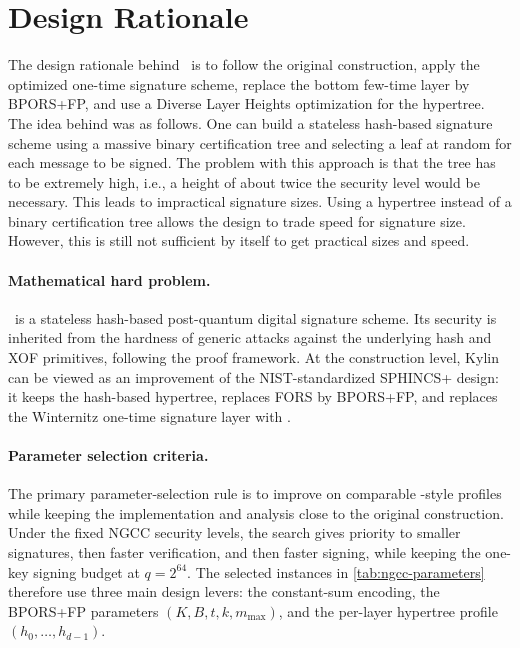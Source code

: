 \section{Design Rationale}
\label{sec:design-rationale}

The design rationale behind \SPHINCSA\ is to follow the original \SPHINCSP construction, apply the optimized \WOTSCS one-time signature scheme, replace the bottom few-time layer by BPORS+FP, and use a Diverse Layer Heights optimization for the hypertree. The idea behind \SPHINCSP was as follows. One can build a stateless hash-based signature scheme using a massive binary certification tree and selecting a leaf at random for each message to be signed. The problem with this approach is that the tree has to be extremely high, i.e., a height of about twice the security level would be necessary. This leads to impractical signature sizes. Using a hypertree instead of a binary certification tree allows the design to trade speed for signature size. However, this is still not sufficient by itself to get practical sizes and speed.

\paragraph{Mathematical hard problem.}
\SPHINCSA\ is a stateless hash-based post-quantum digital signature scheme. Its security is inherited from the hardness of generic attacks against the underlying hash and XOF primitives, following the \SPHINCSP proof framework. At the construction level, Kylin can be viewed as an improvement of the NIST-standardized SPHINCS+ design: it keeps the hash-based hypertree, replaces FORS by BPORS+FP, and replaces the Winternitz one-time signature layer with \WOTSCS.

\paragraph{Parameter selection criteria.}
The primary parameter-selection rule is to improve on comparable \SPHINCSP-style profiles while keeping the implementation and analysis close to the original construction. Under the fixed NGCC security levels, the search gives priority to smaller signatures, then faster verification, and then faster signing, while keeping the one-key signing budget at $q=2^{64}$. The selected instances in \cref{tab:ngcc-parameters} therefore use three main design levers: the constant-sum \WOTSCS encoding, the BPORS+FP parameters $(K,B,t,k,m_{\max})$, and the per-layer hypertree profile $(h_0,\ldots,h_{d-1})$.

